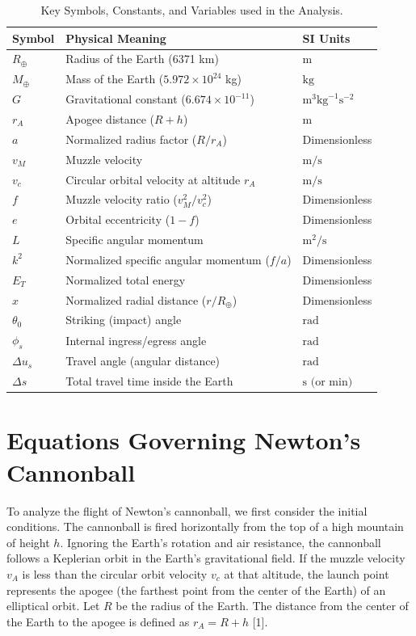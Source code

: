 \documentclass[11pt,letterpaper]{article}
\begin{document}
\begin{table}[h!]
\centering
\caption{Key Symbols, Constants, and Variables used in the Analysis.}
\label{tab:variables}
\begin{tabular}{lll}
\toprule
\textbf{Symbol} & \textbf{Physical Meaning} & \textbf{SI Units} \\
\midrule
$R_{\oplus}$ & Radius of the Earth (6371 km) & $\text{m}$ \\
$M_{\oplus}$ & Mass of the Earth ($5.972 \times 10^{24}$ kg) & $\text{kg}$ \\
$G$ & Gravitational constant ($6.674 \times 10^{-11}$) & $\text{m}^3 \text{kg}^{-1} \text{s}^{-2}$ \\
$r_A$ & Apogee distance ($R + h$) & $\text{m}$ \\
$a$ & Normalized radius factor ($R/r_A$) & Dimensionless \\
$v_M$ & Muzzle velocity & $\text{m/s}$ \\
$v_c$ & Circular orbital velocity at altitude $r_A$ & $\text{m/s}$ \\
$f$ & Muzzle velocity ratio ($v_M^2/v_c^2$) & Dimensionless \\
$e$ & Orbital eccentricity ($1-f$) & Dimensionless \\
$L$ & Specific angular momentum & $\text{m}^2/\text{s}$ \\
$k^2$ & Normalized specific angular momentum ($f/a$) & Dimensionless \\
$E_T$ & Normalized total energy & Dimensionless \\
$x$ & Normalized radial distance ($r/R_{\oplus}$) & Dimensionless \\
$\theta_0$ & Striking (impact) angle & $\text{rad}$ \\
$\phi_s$ & Internal ingress/egress angle & $\text{rad}$ \\
$\Delta u_s$ & Travel angle (angular distance) & $\text{rad}$ \\
$\Delta s$ & Total travel time inside the Earth & $\text{s (or min)}$ \\
\bottomrule
\end{tabular}
\end{table}

\section{Equations Governing Newton's Cannonball}

To analyze the flight of Newton’s cannonball, we first consider the initial conditions. The cannonball is fired horizontally from the top of a high mountain of height $h$. Ignoring the Earth's rotation and air resistance, the cannonball follows a Keplerian orbit in the Earth's gravitational field. If the muzzle velocity $v_A$ is less than the circular orbit velocity $v_c$ at that altitude, the launch point represents the apogee (the farthest point from the center of the Earth) of an elliptical orbit. Let $R$ be the radius of the Earth. The distance from the center of the Earth to the apogee is defined as $r_A = R + h$ [1].
\end{document}
